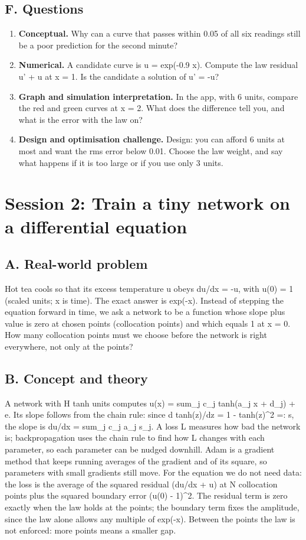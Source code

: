 \documentclass[11pt,a4paper]{article}
\begin{document}
\subsection*{F. Questions}
\begin{enumerate}[nosep]
\item \textbf{Conceptual.} Why can a curve that passes within 0.05 of all six readings still be a poor prediction for the second minute?
\item \textbf{Numerical.} A candidate curve is u = exp(-0.9 x). Compute the law residual u' + u at x = 1. Is the candidate a solution of u' = -u?
\item \textbf{Graph and simulation interpretation.} In the app, with 6 units, compare the red and green curves at x = 2. What does the difference tell you, and what is the error with the law on?
\item \textbf{Design and optimisation challenge.} Design: you can afford 6 units at most and want the rms error below 0.01. Choose the law weight, and say what happens if it is too large or if you use only 3 units.
\end{enumerate}

\section{Session 2: Train a tiny network on a differential equation}

\subsection*{A. Real-world problem}
Hot tea cools so that its excess temperature u obeys du/dx = -u, with u(0) = 1 (scaled units; x is time). The exact answer is exp(-x). Instead of stepping the equation forward in time, we ask a network to be a function whose slope plus value is zero at chosen points (collocation points) and which equals 1 at x = 0. How many collocation points must we choose before the network is right everywhere, not only at the points?

\subsection*{B. Concept and theory}
A network with H tanh units computes u(x) = sum\_j c\_j tanh(a\_j x + d\_j) + e. Its slope follows from the chain rule: since d tanh(z)/dz = 1 - tanh(z)\textasciicircum{}2 =: s, the slope is du/dx = sum\_j c\_j a\_j s\_j. A loss L measures how bad the network is; backpropagation uses the chain rule to find how L changes with each parameter, so each parameter can be nudged downhill. Adam is a gradient method that keeps running averages of the gradient and of its square, so parameters with small gradients still move. For the equation we do not need data: the loss is the average of the squared residual (du/dx + u) at N collocation points plus the squared boundary error (u(0) - 1)\textasciicircum{}2. The residual term is zero exactly when the law holds at the points; the boundary term fixes the amplitude, since the law alone allows any multiple of exp(-x). Between the points the law is not enforced: more points means a smaller gap.
\end{document}
